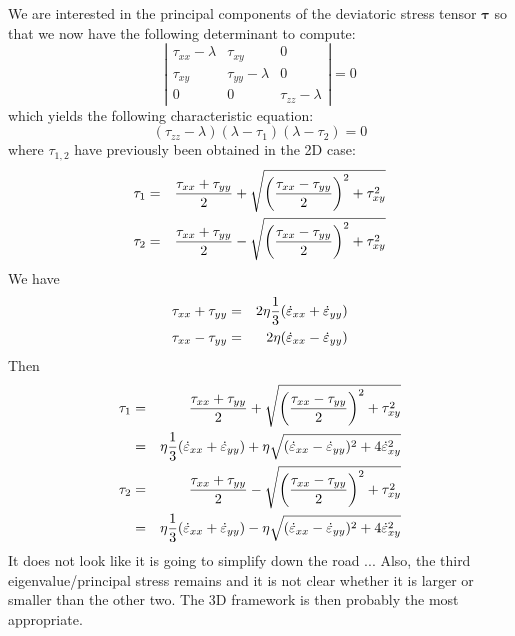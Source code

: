 We are interested in the principal components
of the deviatoric stress tensor $\bm \tau$ so that we now have the following determinant to compute:
\[
\left|  
\begin{array}{ccc}
\tau_{xx}-\lambda & \tau_{xy} & 0 \\
\tau_{xy} & \tau_{yy}-\lambda & 0 \\
0 &0 & \tau_{zz} -\lambda
\end{array}
\right|
=0
\]
which yields the following characteristic equation:
\[
(\tau_{zz} -\lambda)(\lambda-\tau_1)(\lambda-\tau_2) =0
\]
where $\tau_{1,2}$ have previously been obtained in the 2D case:
\begin{eqnarray}
\tau_1 
&=& \frac{ \tau_{xx}+\tau_{yy}}{2} 
+ \sqrt{ \left(\frac{\tau_{xx}-\tau_{yy}}{2}\right)^2 +\tau_{xy}^2 } 
\nonumber\\
\tau_2 &=& \frac{ \tau_{xx}+\tau_{yy}}{2} 
- \sqrt{ \left(\frac{\tau_{xx}-\tau_{yy}}{2}\right)^2 +\tau_{xy}^2 } \label{eq:princ_stress_2D} 
\end{eqnarray}
We have 
\begin{eqnarray}
\tau_{xx}+\tau_{yy} &=& 2\eta \frac13 (\dot{\varepsilon}_{xx} + \dot{\varepsilon}_{yy}) \nonumber\\
\tau_{xx}-\tau_{yy} &=& 2\eta (\dot{\varepsilon}_{xx} - \dot{\varepsilon}_{yy})
\end{eqnarray}
Then 
\begin{eqnarray}
\tau_1 
&=& \frac{ \tau_{xx}+\tau_{yy}}{2} 
+ \sqrt{ \left(\frac{\tau_{xx}-\tau_{yy}}{2}\right)^2 +\tau_{xy}^2 } 
\nonumber\\
&=& \eta \frac13 (\dot{\varepsilon}_{xx} + \dot{\varepsilon}_{yy})
+ \eta \sqrt{ (\dot{\varepsilon}_{xx} - \dot{\varepsilon}_{yy})^2 +4  \dot{\varepsilon}_{xy}^2  } 
\nonumber\\
\tau_2 
&=& \frac{ \tau_{xx}+\tau_{yy}}{2} 
- \sqrt{ \left(\frac{\tau_{xx}-\tau_{yy}}{2}\right)^2 +\tau_{xy}^2 } \nonumber\\
&=& \eta \frac13 (\dot{\varepsilon}_{xx} + \dot{\varepsilon}_{yy})
- \eta \sqrt{ (\dot{\varepsilon}_{xx} - \dot{\varepsilon}_{yy})^2 +4  \dot{\varepsilon}_{xy}^2  } 
\end{eqnarray}
It does not look like it is going to simplify down the road ... Also, 
the third eigenvalue/principal stress remains and it is not clear whether it is 
larger or smaller than the other two.
The 3D framework is then probably the most appropriate.











